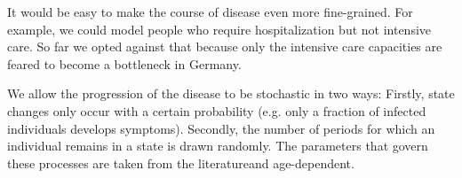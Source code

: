 It would be easy to make the course of disease even more fine-grained. For example, we
could model people who require hospitalization but not intensive care. So far we opted
against that because only the intensive care capacities are feared to become a bottleneck
in Germany.

We allow the progression of the disease to be stochastic in two ways: Firstly, state
changes only occur with a certain probability (e.g. only a fraction of infected
individuals develops symptoms). Secondly, the number of periods for which an individual
remains in a state is drawn randomly. The parameters that govern these processes are
taken from the literature\footnotemark and age-dependent.

